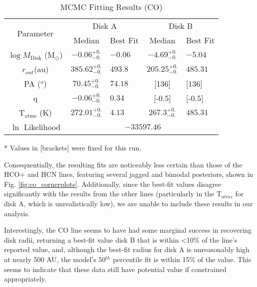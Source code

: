 \begin{table}[h!]
  \centering
  \begin{threeparttable}
    \caption{MCMC Fitting Results (CO)}
    \label{table:fit_co}
    \renewcommand{\arraystretch}{1.2}
    \begin{tabular}{c c l c l }
      \toprule \toprule
      \multirow{2}{*}{Parameter} & \multicolumn{2}{c}{Disk A} & \multicolumn{2}{c}{Disk B} \\
                                 & Median & Best Fit          & Median & Best Fit \\
      \midrule %
      $\log M_\text{Disk}$ (M$_\odot$) & $ -0.06_{-0.}^{+0.}$ & $-0.06$    & $ -4.69_{-0.} ^{+0.}$ & $-5.04$ \\
      $r_{out}$(au)       & $ 385.62_{-0.}^{+0.}$ & $493.8$    & $ 205.25_{-0.} ^{+0.}$  & $485.31$    \\
      PA  ($^o$)          & $ 70.45_{-0.}^{+0.}$ & $74.18$  & [136]  & [136]  \\
      q                   & $ -0.06_{-0.} ^{+0.}$ & $0.34$  & [-0.5]  & [-0.5]  \\
      T$_\text{atms}$ (K) & $ 272.01_{-0.} ^{+0.}$ & $4.13 $  & $ 267.3_{-0.}^{+0.}$  & $485.31$  \\
      $\ln$ Likelihood          & \multicolumn{4}{c}{$-33597.46$} \\
      \bottomrule
    \end{tabular}

    \begin{tablenotes}\footnotesize
      \item[*] Values in [brackets] were fixed for this run.
    \end{tablenotes}
  \end{threeparttable}
\end{table}

Consequentially, the resulting fits are noticeably less certain than those of the HCO+ and HCN lines, featuring several jagged and bimodal posteriors, shown in Fig. \ref{fig:co_cornerplots}. Additionally, since the best-fit values disagree significantly with the results from the other lines (particularly in the T$_{atms}$ for disk A, which is unrealistically low), we are unable to include these results in our analysis.

Interestingly, the CO line seems to have had some marginal success in recovering disk radii, returning a best-fit value disk B that is within \textless10\% of the \hco line's reported value, and, although the best-fit radius for disk A is unreasonably high at nearly 500 AU, the model's 50$^{th}$ percentile fit is within 15\% of the \hco value. This seems to indicate that these data still have potential value if constrained appropriately.









